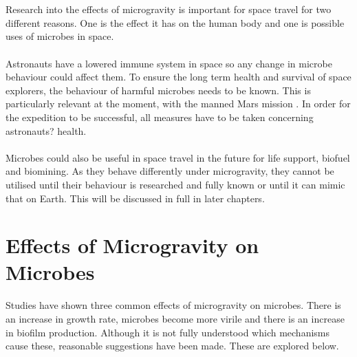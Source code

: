 \documentclass[12pt]{article}
\begin{document}
\\ \\Research into the effects of microgravity is important for space travel for two different reasons. One is the effect it has on the human body and one is possible uses of microbes in space.
\\ \\Astronauts have a lowered immune system in space  so any change in microbe behaviour could affect them. To ensure the long term health and survival of space explorers, the behaviour of harmful microbes needs to be known. This is particularly relevant at the moment, with the manned Mars mission . In order for the expedition to be successful, all measures have to be taken concerning astronauts? health.
\\ \\Microbes could also be useful in space travel in the future for life support, biofuel and biomining. As they behave differently under microgravity, they cannot be utilised until their behaviour is researched and fully known or until it can mimic that on Earth. This will be discussed in full in later chapters.

\section{Effects of Microgravity on Microbes}

Studies have shown three common effects of microgravity on microbes. There is an increase in growth rate, microbes become more virile and there is an increase in biofilm production. Although it is not fully understood which mechanisms cause these, reasonable suggestions have been made. These are explored below. 
\end{document}
